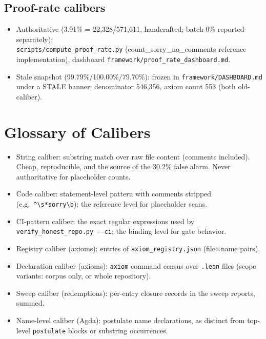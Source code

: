 \documentclass[11pt,a4paper]{article}
\newcommand{\caliber}[1]{\textsf{#1}}
\begin{document}
\subsection{Proof-rate calibers}
\begin{itemize}\small
\item Authoritative (3.91\% = 22,328/571,611, handcrafted; batch
0\% reported separately):\\
\texttt{scripts/compute\_proof\_rate.py}
(count\_sorry\_no\_comments reference implementation), dashboard
\texttt{framework/proof\_rate\_dashboard.md}.
\item Stale snapshot (99.79\%/100.00\%/79.70\%): frozen in
\texttt{framework/DASHBOARD.md} under a STALE banner; denominator
546,356, axiom count 553 (both old-caliber).
\end{itemize}

\section{Glossary of Calibers}\label{sec:glossary}\label{sec:calibers}
\begin{itemize}
\item \caliber{String caliber}: substring match over raw file
content (comments included). Cheap, reproducible, and the source
of the 30.2\% false alarm. Never authoritative for placeholder
counts.
\item \caliber{Code caliber}: statement-level pattern with
comments stripped (e.g.\ \texttt{\^{}\textbackslash s*sorry\textbackslash b});
the reference level for placeholder scans.
\item \caliber{CI-pattern caliber}: the exact regular expressions
used by \texttt{verify\_honest\_repo.py -{}-ci}; the binding level
for gate behavior.
\item \caliber{Registry caliber} (axioms): entries of
\texttt{axiom\_registry.json} (file$\times$name pairs).
\item \caliber{Declaration caliber} (axioms): \texttt{axiom}
command census over \texttt{.lean} files (scope variants: corpus
only, or whole repository).
\item \caliber{Sweep caliber} (redemptions): per-entry closure
records in the sweep reports, summed.
\item \caliber{Name-level caliber} (Agda): postulate name
declarations, as distinct from top-level \texttt{postulate} blocks
or substring occurrences.
\end{itemize}
\end{document}

